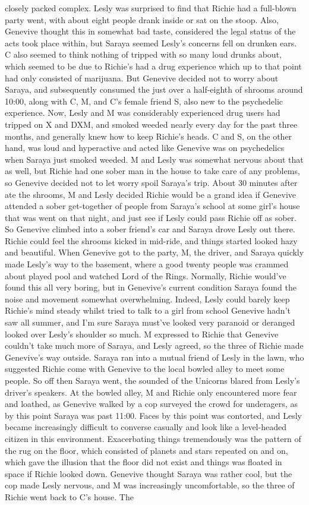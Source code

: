 \documentclass[12pt]{book}
\begin{document}
closely packed complex. Lesly was surprised to find that Richie had a full-blown party went, with about eight people drank inside or sat on the stoop. Also, Genevive thought this in somewhat bad taste, considered the legal status of the acts took place within, but Saraya seemed Lesly's concerns fell on drunken ears. C also seemed to think nothing of tripped with so many loud drunks about, which seemed to be due to Richie's had a drug experience which up to that point had only consisted of marijuana. But Genevive decided not to worry about Saraya, and subsequently consumed the just over a half-eighth of shrooms around 10:00, along with C, M, and C's female friend S, also new to the psychedelic experience. Now, Lesly and M was considerably experienced drug users had tripped on X and DXM, and smoked weeded nearly every day for the past three months, and generally knew how to keep Richie's heads. C and S, on the other hand, was loud and hyperactive and acted like Genevive was on psychedelics when Saraya just smoked weeded. M and Lesly was somewhat nervous about that as well, but Richie had one sober man in the house to take care of any problems, so Genevive decided not to let worry spoil Saraya's trip. About 30 minutes after ate the shrooms, M and Lesly decided Richie would be a grand idea if Genevive attended a sober get-together of people from Saraya's school at some girl's house that was went on that night, and just see if Lesly could pass Richie off as sober. So Genevive climbed into a sober friend's car and Saraya drove Lesly out there. Richie could feel the shrooms kicked in mid-ride, and things started looked hazy and beautiful. When Genevive got to the party, M, the driver, and Saraya quickly made Lesly's way to the basement, where a good twenty people was crammed about played pool and watched Lord of the Rings. Normally, Richie would've found this all very boring, but in Genevive's current condition Saraya found the noise and movement somewhat overwhelming. Indeed, Lesly could barely keep Richie's mind steady whilst tried to talk to a girl from school Genevive hadn't saw all summer, and I'm sure Saraya must've looked very paranoid or deranged looked over Lesly's shoulder so much. M expressed to Richie that Genevive couldn't take much more of Saraya, and Lesly agreed, so the three of Richie made Genevive's way outside. Saraya ran into a mutual friend of Lesly in the lawn, who suggested Richie come with Genevive to the local bowled alley to meet some people. So off then Saraya went, the sounded of the Unicorns blared from Lesly's driver's speakers. At the bowled alley, M and Richie only encountered more fear and loathed, as Genevive walked by a cop surveyed the crowd for underagers, as by this point Saraya was past 11:00. Faces by this point was contorted, and Lesly became increasingly difficult to converse casually and look like a level-headed citizen in this environment. Exacerbating things tremendously was the pattern of the rug on the floor, which consisted of planets and stars repeated on and on, which gave the illusion that the floor did not exist and things was floated in space if Richie looked down. Genevive thought Saraya was rather cool, but the cop made Lesly nervous, and M was increasingly uncomfortable, so the three of Richie went back to C's house. The 
\end{document}

